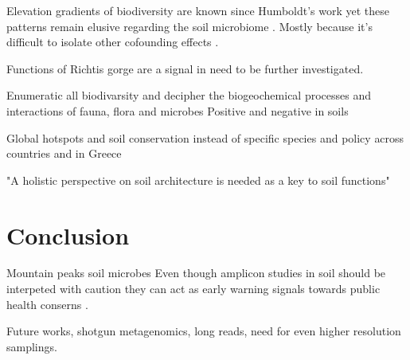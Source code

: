 \documentclass[unnumsec,webpdf,contemporary,large]{oup-authoring-template}%
\theoremstyle{thmstyleone}%
\theoremstyle{thmstyletwo}%
\theoremstyle{thmstylethree}%
\begin{document}
Elevation gradients of biodiversity are known since Humboldt's work \cite{Rahbek2019} 
yet these patterns remain elusive regarding the soil microbiome \cite{Looby2020, Siles2023}.
Mostly because it's difficult to isolate other cofounding effects \cite{Nottingham2018}. 

Functions of Richtis gorge are a signal in need to be further investigated.

Enumeratic all biodivarsity \cite{Anthony2023} and decipher the biogeochemical 
processes and interactions of fauna, flora and microbes \cite{Fry2019, Crowther2019,GRANDY201640,Delgado-Baquerizo2020}
Positive and negative in soils \cite{Liu2024}

Global hotspots \cite{Guerra2022}
and soil conservation instead of specific species \cite{Guerra2021}
and policy \cite{KONINGER2022} across countries \cite{Putten2023} and in Greece \cite{SCHISMENOS2022100035}

"A holistic perspective on soil architecture is needed as a key to soil functions" \cite{philippot2024the-interplay}
\section{Conclusion}

Mountain peaks soil microbes \cite{Adamczyk2019}
Even though amplicon studies in soil should be interpeted with caution \cite{alteio2021} they 
can act as early warning signals towards public health conserns \cite{Banerjee2023}.

Future works, shotgun metagenomics, long reads, need for even higher resolution samplings. 



\end{document}
